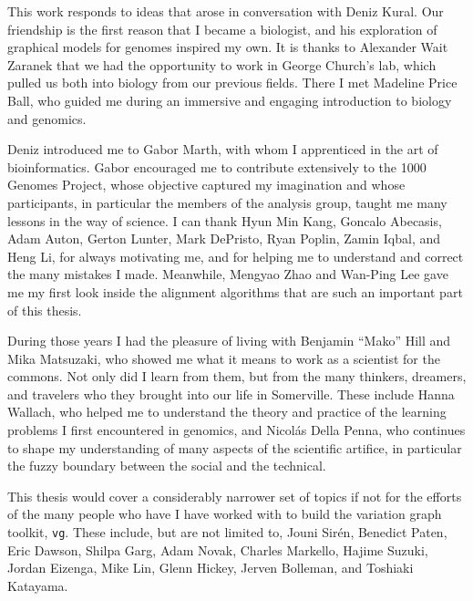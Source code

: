 
\begin{acknowledgements}

  This work responds to ideas that arose in conversation with Deniz Kural.
  Our friendship is the first reason that I became a biologist, and his exploration of graphical models for genomes inspired my own.
  It is thanks to Alexander Wait Zaranek that we had the opportunity to work in George Church's lab, which pulled us both into biology from our previous fields.
  There I met Madeline Price Ball, who guided me during an immersive and engaging introduction to biology and genomics.
  
  Deniz introduced me to Gabor Marth, with whom I apprenticed in the art of bioinformatics.
  Gabor encouraged me to contribute extensively to the 1000 Genomes Project, whose objective captured my imagination and whose participants, in particular the members of the analysis group, taught me many lessons in the way of science.
  I can thank Hyun Min Kang, Goncalo Abecasis, Adam Auton, Gerton Lunter, Mark DePristo, Ryan Poplin, Zamin Iqbal, and Heng Li, for always motivating me, and for helping me to understand and correct the many mistakes I made.
  Meanwhile, Mengyao Zhao and Wan-Ping Lee gave me my first look inside the alignment algorithms that are such an important part of this thesis.

  During those years I had the pleasure of living with Benjamin ``Mako'' Hill and Mika Matsuzaki, who showed me what it means to work as a scientist for the commons.
  Not only did I learn from them, but from the many thinkers, dreamers, and travelers who they brought into our life in Somerville.
  These include Hanna Wallach, who helped me to understand the theory and practice of the learning problems I first encountered in genomics, and Nicol\'{a}s Della Penna, who continues to shape my understanding of many aspects of the scientific artifice, in particular the fuzzy boundary between the social and the technical.
  
  This thesis would cover a considerably narrower set of topics if not for the efforts of the many people who have I have worked with to build the variation graph toolkit, {\tt vg}.
  These include, but are not limited to,
  Jouni Sir\'{e}n,
  Benedict Paten,
  Eric Dawson,
  Shilpa Garg,
  Adam Novak,
  Charles Markello,
  Hajime Suzuki,
  Jordan Eizenga,
  Mike Lin,
  Glenn Hickey,
  Jerven Bolleman,
  and Toshiaki Katayama.


\end{acknowledgements}
